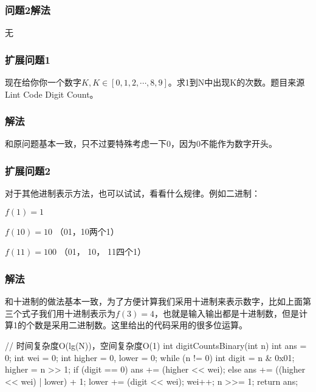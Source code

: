 \subsubsection{问题2解法}
无

\subsubsection{扩展问题1}
现在给你你一个数字$K, K \in [0, 1, 2, \cdots , 8, 9]$。求1到N中出现K的次数。题目来源 Lint Code Digit Count。

\subsubsection{解法}
和原问题基本一致，只不过要特殊考虑一下0，因为0不能作为数字开头。

\subsubsection{扩展问题2}
对于其他进制表示方法，也可以试试，看看什么规律。例如二进制：

$f(1) = 1$

$f(10) = 10$ （01，10两个1）

$f(11) = 100$ （01， 10， 11四个1）


\subsubsection{解法}
和十进制的做法基本一致，为了方便计算我们采用十进制来表示数字，比如上面第三个式子我们用十进制表示为$f(3) = 4$，也就是输入输出都是十进制数，但是计算1的个数是采用二进制数。这里给出的代码采用的很多位运算。
\begin{Code}
// 时间复杂度O(lg(N))，空间复杂度O(1)
int digitCountsBinary(int n) {
    int ans = 0;
    int wei = 0;
    int higher = 0, lower = 0;
    while (n != 0) {
        int digit = n & 0x01;
        higher = n >> 1;
        if (digit == 0) {
            ans += (higher << wei);
        } else {
        ans += ((higher << wei) | lower) + 1;
        }
        lower += (digit << wei);
        wei++;
        n >>= 1;
    }
    return ans;
}
\end{Code}

